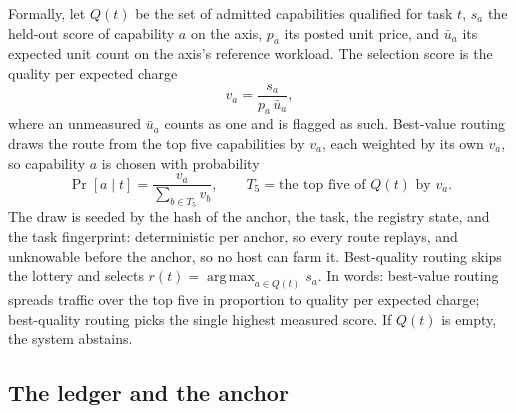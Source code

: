 \documentclass[11pt]{article}
\DeclareMathOperator{\argmax}{arg\,max}
\begin{document}
Formally, let $Q(t)$ be the set of admitted capabilities
qualified for task $t$, $s_a$ the held-out score of capability
$a$ on the axis, $p_a$ its posted unit price, and $\bar u_a$ its
expected unit count on the axis's reference workload. The
selection score is the quality per expected charge
\begin{equation}
v_a = \frac{s_a}{p_a \, \bar u_a},
\end{equation}
where an unmeasured $\bar u_a$ counts as one and is flagged as
such. Best-value routing draws the route from the top five
capabilities by $v_a$, each weighted by its own $v_a$, so
capability $a$ is chosen with probability
\begin{equation}
\Pr[a \mid t] = \frac{v_a}{\sum_{b \in T_5} v_b},
\qquad
T_5 = \text{the top five of } Q(t) \text{ by } v_a.
\end{equation}
The draw is seeded by the hash of the anchor, the task, the
registry state, and the task fingerprint: deterministic per
anchor, so every route replays, and unknowable before the
anchor, so no host can farm it. Best-quality routing skips the
lottery and selects $r(t) = \argmax_{a \in Q(t)} s_a$. In words:
best-value routing spreads traffic over the top five in
proportion to quality per expected charge; best-quality routing
picks the single highest measured score. If $Q(t)$ is empty, the
system abstains.

\subsection{The ledger and the anchor}
\end{document}
